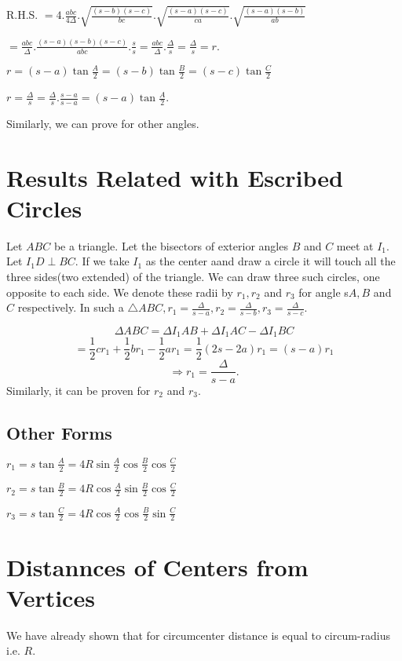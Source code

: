   R.H.S. $= 4.\frac{abc}{4\Delta}.\sqrt{\frac{(s - b)(s - c)}{bc}}.\sqrt{\frac{(s - a)(s - c)}{ca}}.\sqrt{\frac{(s - a)(s - b)}{ab}}$

  $= \frac{abc}{\Delta}.\frac{(s - a)(s - b)(s - c)}{abc}.\frac{s}{s} = \frac{abc}{\Delta}.\frac{\Delta}{s} = \frac{\Delta}{s} = r$.
\item $r = (s - a)\tan\frac{A}{2} = (s - b)\tan\frac{B}{2} = (s - c)\tan\frac{C}{2}$

  $r = \frac{\Delta}{s} = \frac{\Delta}{s}.\frac{s - a}{s - a} = (s - a)\tan\frac{A}{2}$.

  Similarly, we can prove for other angles.
\stopitemize

\section{Results Related with Escribed Circles}
Let $ABC$ be a triangle. Let the bisectors of exterior angles $B$ and $C$ meet at $I_1$. Let $I_1D\perp BC$. If we take $I_1$ as
the center aand draw a circle it will touch all the three sides(two extended) of the triangle. We can draw three such circles, one
opposite to each side. We denote these radii by $r_1, r_2$ and $r_3$ for angle s$A, B$ and $C$ respectively.
\starttheorem
  In such a $\triangle ABC, r_1 = \frac{\Delta}{s - a}, r_2 = \frac{\Delta}{s - b}, r_3 = \frac{\Delta}{s - c}$.
  \startplacefigure[title={}, reference=fig:esc]
    \externalfigure[16_1_10.pdf]
  \stopplacefigure
\stoptheorem

\startproof
  $$\Delta ABC = \Delta I_1AB + \Delta I_1AC - \Delta I_1BC$$
  $$=\frac{1}{2}cr_1 + \frac{1}{2}br_1 - \frac{1}{2}ar_1 = \frac{1}{2}(2s - 2a)r_1 = (s - a)r_1$$
  $$\Rightarrow r_1 = \frac{\Delta}{s - a}.$$
  Similarly, it can be proven for $r_2$ and $r_3$.
\stopproof

\subsection{Other Forms}
\startitemize[n, 1*broad]
\item $r_1 = s\tan\frac{A}{2} = 4R\sin\frac{A}{2}\cos\frac{B}{2}\cos\frac{C}{2}$
\item $r_2 = s\tan\frac{B}{2} = 4R\cos\frac{A}{2}\sin\frac{B}{2}\cos\frac{C}{2}$
\item $r_3 = s\tan\frac{C}{2} = 4R\cos\frac{A}{2}\cos\frac{B}{2}\sin\frac{C}{2}$
\stopitemize

\section{Distannces of Centers from Vertices}
We have already shown that for circumcenter distance is equal to circum-radius i.e. $R$.

